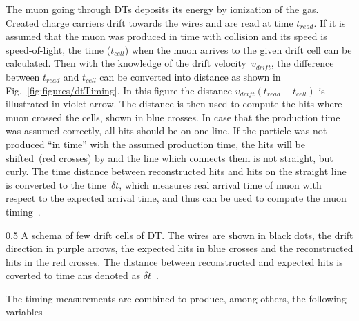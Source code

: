 The muon going through DTs deposits its energy by ionization of the gas. Created charge carriers drift towards the wires and are read at time $t_{read}$. If it is assumed that the muon was produced in time with collision and its speed is speed-of-light, the time ($t_{cell}$) when the muon arrives to the given drift cell can be calculated. Then with the knowledge of the drift velocity~$v_{drift}$, the difference between $t_{read}$ and $t_{cell}$ can be converted into distance as shown in Fig.~\ref{fig:figures/dtTiming}. In this figure the distance $ v_{drift} (t_{read} - t_{cell})$ is illustrated in violet arrow. The distance is then used to compute the hits where muon crossed the cells, shown in blue crosses. In case that the production time was assumed correctly, all hits should be on one line. If the particle was not produced ``in time'' with the assumed production time, the hits will be shifted~(red crosses) by and the line which connects them is not straight, but curly. The time distance between reconstructed hits and hits on the straight line is converted to the time~$\delta t$, which measures real arrival time of muon with respect to the expected arrival time, and thus can be used to compute the muon timing~\cite{Traczyk:1365029}.


                 {0.5}       %
                 { A schema of few drift cells of DT. The wires are shown in black dots, the drift direction in purple arrows, the expected hits in blue crosses and the reconstructed hits in the red crosses. The distance between reconstructed and expected hits is coverted to time ans denoted as $\delta t$~\cite{Traczyk:1365029}. }

The timing measurements are combined to produce, among others, the following variables 

